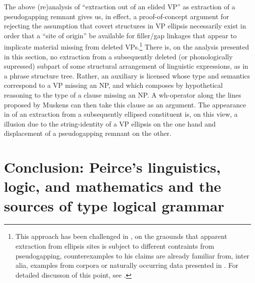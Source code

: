 \documentclass[output=paper,colorlinks,citecolor=brown]{langscibook}
\begin{document}
The above (re)analysis of ``extraction out of an elided VP'' as
extraction of a pseudogapping remnant gives us, in effect, a
proof-of-concept argument for rejecting the assumption that covert
structures in VP ellipsis necessarily exist in order that a ``site of
origin'' be available for filler/gap linkages that appear to implicate
material missing from deleted VPs.\footnote{This approach has been
challenged in \citet{johnson2001}, on the graounds that apparent extraction
from ellipsis sites is subject to different contraints from
pseudogapping, counterexamples to his claims are already familiar
from, inter alia, examples from corpora or naturally occurring data
presented in \citet{levin-diss}. For detailed discusson of this point, see
\citet[Section~8.4.2]{kubotalevineBook}.} There is, on the analysis
presented in this section, no extraction from a subsequently deleted
(or phonologically supressed) subpart of some structural arrangement
of linguistic expressions, as in a phrase structure tree. Rather, an
auxiliary is licensed whose type and semantics correspond to a VP
missing an NP, and which composes by hypothetical reasoning to the
type of a clause missing an NP. A wh-operator along the lines
proposed by Muskens can then take this clause as an argument. The
appearance in  of an extraction from a subsequently
ellipsed constituent is, on this view, a illusion due to the
string-identity of a VP ellipsis on the one hand and displacement of a
pseudogapping remnant on the other.

\section{Conclusion: Peirce's linguistics, logic, and mathematics and the sources of type logical grammar}
\end{document}
